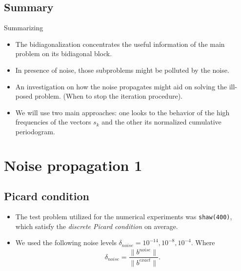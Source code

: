 \documentclass{beamer}
\begin{document}
\subsection{Summary}
\begin{frame}{Summarizing}
  \begin{itemize}
    \item The bidiagonalization concentrates the useful information of the
      main problem on its bidiagonal block.
      
    \item In presence of noise, those subproblems might be polluted by the
      noise.

    \item An investigation on how the noise propagates might aid on solving the
      ill-posed problem. (When to stop the iteration procedure).

    \item We will use two main approaches: one looks to the behavior of the
      high frequencies of the vectors $s_{k}$ and the other its normalized
      cumulative periodogram.
  \end{itemize}
\end{frame}

\section{Noise propagation 1}
\subsection{Picard condition}
\begin{frame}
  \begin{itemize}
    \item The test problem utilized for the numerical experiments was
      \texttt{shaw(400)}, which satisfy the \emph{discrete Picard condition} on
      average.

    \item We used the following noise levels $\delta_{noise} = 10^{-14}, 
      10^{-8}, 10^{-4}$. Where
      \begin{equation*}
	\delta_{noise} = \frac{\|b^{noise}\|}{\|b^{exact}\|}.
      \end{equation*}
  \end{itemize}
\end{frame}
\end{document}
